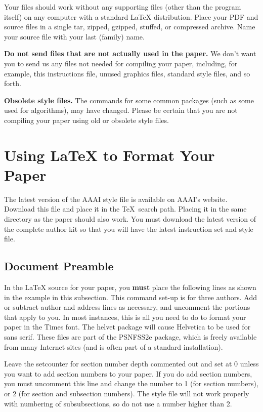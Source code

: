 \documentclass[letterpaper]{article} %
\begin{document}
Your files should work without any supporting files (other than the program itself) on any computer with a standard \LaTeX{} distribution. Place your PDF and source files in a single tar, zipped, gzipped, stuffed, or compressed archive. Name your source file with your last (family) name.

\textbf{Do not send files that are not actually used in the paper.} We don't want you to send us any files not needed for compiling your paper, including, for example, this instructions file, unused graphics files, standard style files, and so forth.

\textbf{Obsolete style files.}  The commands for some common packages (such as some used for algorithms), may have changed. Please be certain that you are not compiling your paper using old or obsolete style files. 

\section{Using \LaTeX{} to Format Your Paper}

The latest version of the AAAI style file is available on AAAI's website. Download this file and place it in  the \TeX\ search path. Placing it in the same directory as the paper should also work. You must download the latest version of the complete author kit so that you will have the latest instruction set and style file.

\subsection{Document Preamble}

In the \LaTeX{} source for your paper, you \textbf{must} place the following lines as shown in the example in this subsection. This command set-up is for three authors. Add or subtract author and address lines as necessary, and uncomment the portions that apply to you. In most instances, this is all you need to do to format your paper in the Times font. The helvet package will cause Helvetica to be used for sans serif. These files are part of the PSNFSS2e package, which is freely available from many Internet sites (and is often part of a standard installation).

Leave the setcounter for section number depth commented out and set at 0 unless you want to add section numbers to your paper. If you do add section numbers, you must uncomment this line and change the number to 1 (for section numbers), or 2 (for section and subsection numbers). The style file will not work properly with numbering of subsubsections, so do not use a number higher than 2.
\end{document}
